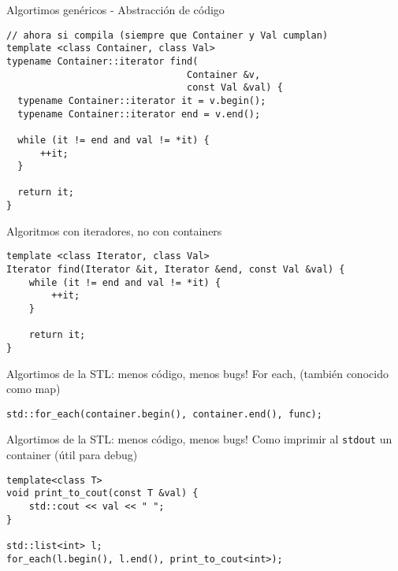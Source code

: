 \begin{frame}[fragile]{Algortimos gen\'ericos - Abstracci\'on de c\'odigo}
      \begin{lstlisting}[style=normal]
// ahora si compila (siempre que Container y Val cumplan)
template <class Container, class Val>
typename Container::iterator find(
                                Container &v,
                                const Val &val) {
  typename Container::iterator it = v.begin();
  typename Container::iterator end = v.end();

  while (it != end and val != *it) {
      ++it;
  }

  return it;
}
      \end{lstlisting}
\end{frame}

\begin{frame}[fragile]{Algoritmos con iteradores, no con containers}
      \begin{lstlisting}[style=normal]
template <class Iterator, class Val>
Iterator find(Iterator &it, Iterator &end, const Val &val) {
    while (it != end and val != *it) {
        ++it;
    }

    return it;
}
      \end{lstlisting}
\end{frame}


\begin{frame}[fragile]{Algortimos de la STL: menos c\'odigo, menos bugs!}
For each, (tambi\'en conocido como map)
      \begin{lstlisting}[style=normal]
std::for_each(container.begin(), container.end(), func);
      \end{lstlisting}
\end{frame}

\begin{frame}[fragile]{Algortimos de la STL: menos c\'odigo, menos bugs!}
Como imprimir al \lstinline[style=normal]!stdout! un container (\'util para debug)
      \begin{lstlisting}[style=normal]
template<class T>
void print_to_cout(const T &val) {
    std::cout << val << " ";
}

std::list<int> l;
for_each(l.begin(), l.end(), print_to_cout<int>);
      \end{lstlisting}
\end{frame}


